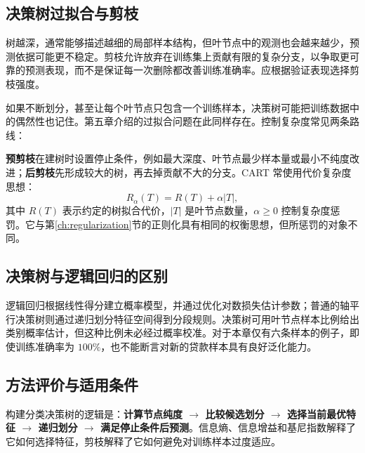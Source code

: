 \subsection{决策树过拟合与剪枝}

树越深，通常能够描述越细的局部样本结构，但叶节点中的观测也会越来越少，预测依据可能更不稳定。剪枝允许放弃在训练集上贡献有限的复杂分支，以争取更可靠的预测表现，而不是保证每一次删除都改善训练准确率。应根据验证表现选择剪枝强度。

如果不断划分，甚至让每个叶节点只包含一个训练样本，决策树可能把训练数据中的偶然性也记住。第五章介绍的过拟合问题在此同样存在。控制复杂度常见两条路线：

\textbf{预剪枝}在建树时设置停止条件，例如最大深度、叶节点最少样本量或最小不纯度改进；\textbf{后剪枝}先形成较大的树，再去掉贡献不大的分支。CART 常使用代价复杂度思想：
\begin{equation}\label{eq:cost-complexity-tree}
R_\alpha(T)=R(T)+\alpha|T|,
\end{equation}
其中 $R(T)$ 表示约定的树拟合代价，$|T|$ 是叶节点数量，$\alpha\geq0$ 控制复杂度惩罚。它与第\ref{ch:regularization}节的正则化具有相同的权衡思想，但所惩罚的对象不同。

\subsection{决策树与逻辑回归的区别}

逻辑回归根据线性得分建立概率模型，并通过优化对数损失估计参数；普通的轴平行决策树则通过递归划分特征空间得到分段规则。决策树可用叶节点样本比例给出类别概率估计，但这种比例未必经过概率校准。对于本章仅有六条样本的例子，即使训练准确率为 $100\%$，也不能断言对新的贷款样本具有良好泛化能力。

\subsection{方法评价与适用条件}

构建分类决策树的逻辑是：\textbf{计算节点纯度 $\rightarrow$ 比较候选划分 $\rightarrow$ 选择当前最优特征 $\rightarrow$ 递归划分 $\rightarrow$ 满足停止条件后预测}。信息熵、信息增益和基尼指数解释了它如何选择特征，剪枝解释了它如何避免对训练样本过度适应。
